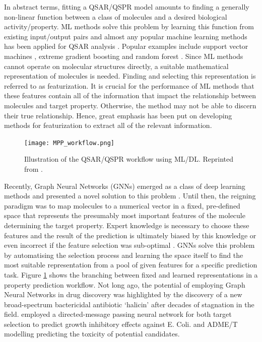 In abstract terms, fitting a QSAR/QSPR model amounts to finding a generally non-linear function between a class of molecules and a desired biological activity/property. ML methods solve this problem by learning this function from existing input/output pairs and almost any popular machine learning methods has been applied for QSAR analysis \cite{SHEN201929}. Popular examples include support vector machines \cite{supv1, supv2}, extreme gradient boosting \cite{XG1, XG2} and random forest \cite{RF1}. Since ML methods cannot operate on molecular structures directly, a suitable mathematical representation of molecules is needed. Finding and selecting this representation is referred to as featurization. It is crucial for the performance of ML methods that these features contain all of the information that impact the relationship between molecules and target property. Otherwise, the method may not be able to discern their true relationship. Hence, great emphasis has been put on developing methods for featurization to extract all of the relevant information.

\begin{figure}[h]
	\centering 
	\texttt{[image: MPP\_workflow.png]}
	\caption{Illustration of the QSAR/QSPR workflow using ML/DL. Reprinted from \cite{yangMPP}. }
	\label{fig:mpp_workflow}
\end{figure}
Recently, Graph Neural Networks (GNNs) emerged as a class of deep learning methods and presented a novel solution to this problem \citep{duvenaud2015convolutional, li2019deepchemstable, STOKES2020688}. Until then, the reigning paradigm was to map molecules to a numerical vector in a fixed, pre-defined space that represents the presumably most important features of the molecule determining the target property. Expert knowledge is necessary to choose these features and the result of the prediction is ultimately biased by this knowledge or even incorrect if the feature selection was sub-optimal \citep{WIEDER2020}. GNNs solve this problem by automatising the selection process and learning the space itself to find the most suitable representation from a pool of given features for a specific prediction task. Figure \ref{fig:mpp_workflow} shows the branching between fixed and learned representations in a property prediction workflow. Not long ago, the potential of employing Graph Neural Networks in drug discovery was highlighted by the discovery of a new broad-spectrum bactericidal antibiotic `halicin' after decades of stagnation in the field. \cite{STOKES2020688} employed a directed-message passing neural network \cite{yangMPP} for both target selection to predict growth inhibitory effects against E. Coli. and ADME/T modelling predicting the toxicity of potential candidates.%

